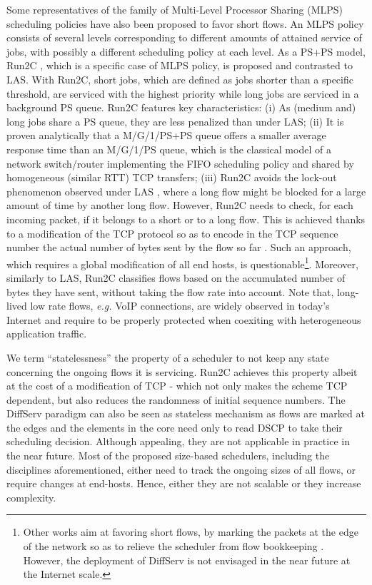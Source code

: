 \documentclass[preprint,12pt]{elsarticle}
\begin{document}
Some representatives of the family of Multi-Level Processor Sharing \linebreak[4] (MLPS) scheduling policies \cite{kleinrock_76_queueing} have also been proposed to favor short flows. An MLPS policy consists of several levels corresponding to different amounts of attained service of jobs, with possibly a different scheduling policy at each level. As a PS+PS model, Run2C \cite{Avrachenkov04Run2c}, which is a specific case of MLPS policy, is proposed and contrasted to LAS. With Run2C, short jobs, which are defined as jobs shorter than a specific threshold, are serviced with the highest priority while long jobs are serviced in a background PS queue. Run2C features key characteristics: (i) As (medium and) long jobs share a PS queue, they are less penalized than under LAS; (ii) It is proven analytically \cite{Avrachenkov04Run2c} that a M/G/1/PS+PS queue offers a smaller average response time than an M/G/1/PS queue, which is the classical model of a network switch/router implementing the FIFO scheduling policy and shared by homogeneous (similar RTT) TCP transfers; (iii) Run2C avoids the lock-out phenomenon observed under LAS \cite{Martin10Lars}, where a long flow might be blocked for a large amount of time by another long flow. However, Run2C needs to check, for each incoming packet, if it belongs to a short or to a long flow. This is achieved thanks to a modification of the TCP protocol so as to encode in the TCP sequence number the actual number of bytes sent by the flow so far \cite{Avrachenkov04Run2c}. Such an approach, which requires a global modification of all end hosts, is questionable\footnote{Other works aim at favoring short flows, by marking the packets at the edge of the network so as to relieve the scheduler from flow bookkeeping \cite{Noureddine02improvingthe}. However, the deployment of DiffServ is not envisaged in the near future at the Internet scale.}. Moreover, similarly to LAS, Run2C classifies flows based on the accumulated number of bytes they have sent, without taking the flow rate into account. Note that, long-lived low rate flows, \textit{e.g.} VoIP connections, are widely observed in today's Internet and require to be properly protected when coexiting with heterogeneous application traffic. 

We term ``statelessness'' the property of a scheduler to not keep any state concerning the ongoing flows it is servicing. Run2C achieves this property albeit at the cost of a modification of TCP -  which not only makes the scheme TCP dependent, but also reduces the randomness of initial sequence numbers. The DiffServ\cite{Noureddine02improvingthe} paradigm can also be seen as stateless mechanism as flows are marked at the edges and the elements in the core need only to read DSCP to take their scheduling decision. Although appealing, they are not applicable in practice in the near future. Most of the proposed size-based schedulers, including the disciplines aforementioned, either need to track the ongoing sizes of all flows, or require changes at end-hosts. Hence, either they are not scalable or they increase complexity. 
\end{document}
